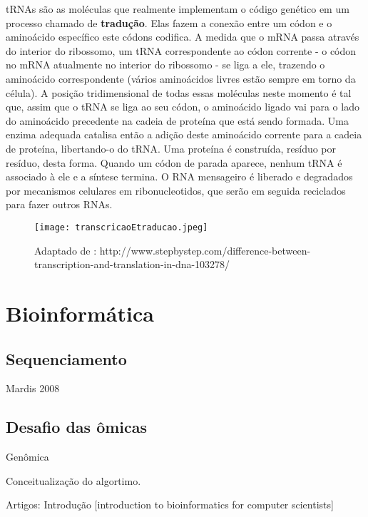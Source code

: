 \indent tRNAs são as moléculas que realmente implementam o código genético em um processo chamado de \textbf{tradução}. Elas fazem a conexão entre um códon e o aminoácido específico este códons codifica. A medida que o mRNA passa através do interior do ribossomo, um tRNA correspondente ao códon corrente - o códon no mRNA atualmente no interior do ribossomo - se liga a ele, trazendo o aminoácido correspondente (vários aminoácidos livres estão sempre em torno da célula). A posição tridimensional de todas essas moléculas neste momento é tal que, assim que o tRNA se liga ao seu códon, o aminoácido ligado vai para o lado do aminoácido precedente na cadeia de proteína que está sendo formada. Uma enzima adequada catalisa então a adição deste aminoácido corrente para a cadeia de proteína, libertando-o do tRNA. Uma proteína é construída, resíduo por resíduo, desta forma. Quando um códon de parada aparece, nenhum tRNA é associado à ele e a síntese termina. O RNA mensageiro é liberado e degradados por mecanismos celulares em ribonucleotidos, que serão em seguida reciclados para fazer outros RNAs. \\




\cite{setubal97}






\begin{figure}[h]
    \centering
    \texttt{[image: transcricaoEtraducao.jpeg]}
    \caption{Adaptado de : http://www.stepbystep.com/difference-between-transcription-and-translation-in-dna-103278/ }
    \label{fig:transcricaoEtraducao}
\end{figure}




\section{Bioinformática} \label{bioinformatica}

\subsection{Sequenciamento} 

\indent Mardis 2008

\subsection{Desafio das ômicas}

\indent 
Genômica

\indent Conceitualização do algortimo.

Artigos:
Introdução
[introduction to bioinformatics for computer scientists]

